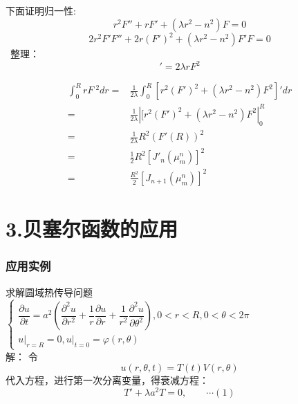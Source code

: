 \begin{frame}
	下面证明归一性:
	\begin{equation*}
		r^2 F''+r F' +(\lambda r^2 -n^2)F=0 
	\end{equation*}	
	\begin{equation*}
		2r^2 F'F''+2r (F')^2 +(\lambda r^2 -n^2)F'F=0 
	\end{equation*}	
	 整理：
	\begin{equation*}
		[r^2 (F')^2 + (\lambda r^2 -n^2)F^2]'=2 \lambda rF^2
	\end{equation*}	
\end{frame}	

\begin{frame}
	\begin{equation*}
		\begin{split}
			\int_0 ^R r F~^2 dr =& \frac{1}{2\lambda} \int_0 ^R [r^2 (F')^2 + (\lambda r^2 -n^2)F^2]' dr  \\
			=& \frac{1}{2\lambda} |[r^2 (F')^2 + (\lambda r^2 -n^2)F^2 |_0 ^R \\
			=& \frac{1}{2\lambda} R^2 (F'(R))^2 \\
			=& \frac{1}{2} R^2 [J'_n(\mu_m ^n)]^2 \\
			=& \frac{R^2}{2} [J_{n+1}(\mu_m ^n)]^2
		\end{split}
	\end{equation*}	
\end{frame}	

\section{3.贝塞尔函数的应用}
\begin{frame}
	\frametitle{应用实例}
	求解圆域热传导问题 \\
	$\left\{
		\begin{array}{l}
		\dfrac{\partial u}{\partial t}=a^{2}\left(\dfrac{\partial^{2} u}{\partial r^{2}}+\dfrac{1}{r} 
		\dfrac{\partial u}{\partial r}+\dfrac{1}{r^{2}} \dfrac{\partial^{2} u}{\partial \theta^{2}}\right), 0<r<R, 0<\theta<2 \pi \\
		\left. u\right|_{r=R}=0,\left.u\right|_{t=0}=\varphi(r, \theta)
	\end{array}
	\right. $\\
	\alert{解：} 令 
	\begin{equation*}
		u(r,\theta,t)= T(t) V(r, \theta) 
	\end{equation*}	
	代入方程，进行第一次分离变量，得衰减方程：\[T'+\lambda a^2 T=0, \qquad \cdots (1) \]	
\end{frame}

